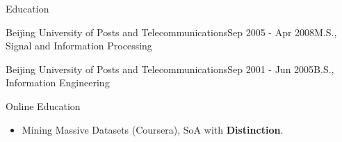 \documentclass{resume} %
\begin{document}
\begin{rSection}{Education}
\begin{rSubsection}{Beijing University of Posts and Telecommunications}{Sep 2005 - Apr 2008}{M.S., Signal and Information Processing}{}
\end{rSubsection}

\begin{rSubsection}{Beijing University of Posts and Telecommunications}{Sep 2001 - Jun 2005}{B.S., Information Engineering}{}
\end{rSubsection}

\begin{rSubsection}{Online Education}{}{}{}
  \begin{itemize}
    \item Mining Massive Datasets (Coursera), SoA with \textbf{Distinction}.
  \end{itemize}
\end{rSubsection}

\end{rSection}
\end{document}
